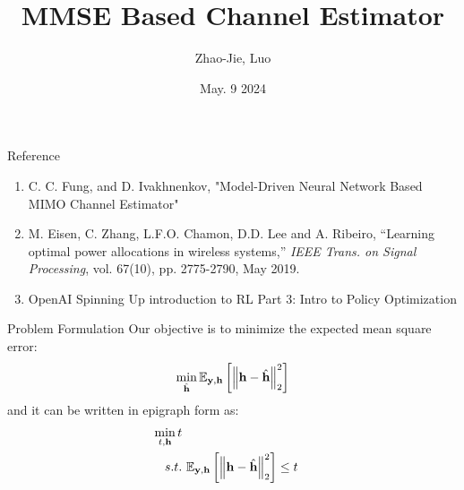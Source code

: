 \documentclass[hyperref={bookmarks=false}]{beamer}
\title{MMSE Based Channel Estimator}
\author{Zhao-Jie, Luo}
\institute[NYCU] %
{
\textit{janny00kevin@gmail.com} %
\\
\medskip
Advisor: Professor Carrson C. Fung\\ 
\medskip
National Yang Ming Chiao Tung University \\ %
}
\date{May. 9 2024}
\numberwithin{figure}{section}
\begin{document}
\frame{\titlepage}

\begin{frame}{Reference}
\begin{enumerate}
    \item C. C. Fung, and D. Ivakhnenkov, "Model-Driven Neural Network Based MIMO Channel Estimator"
    \item M. Eisen, C. Zhang, L.F.O. Chamon, D.D. Lee and A. Ribeiro, ``Learning optimal power allocations in wireless systems,'' \emph{IEEE Trans. on Signal Processing}, vol. 67(10), pp. 2775-2790, May 2019.
    \item OpenAI Spinning Up introduction to RL Part 3: Intro to Policy Optimization %
\end{enumerate}

\end{frame}


\begin{frame}{Problem Formulation}
Our objective is to minimize the expected mean square error:
\begin{align*}
    \min_{\hat{{\bf h}}} \mathbb{E}_{{\bf y},{\bf h}}\left[\left\| {\bf h}-\hat{{\bf h}} \right\|^2_2 \right]\\
\end{align*}
and it can be written in epigraph form as:
\begin{align*}
    \min_{t,{\bf h}} {t}\\
    s.t. &\ \mathbb{E}_{{\bf y},{\bf h}}\left[\left\| {\bf h}-\hat{{\bf h}} \right\|^2_2 \right] \leq t\\
\end{align*}

\end{frame}
\end{document}
